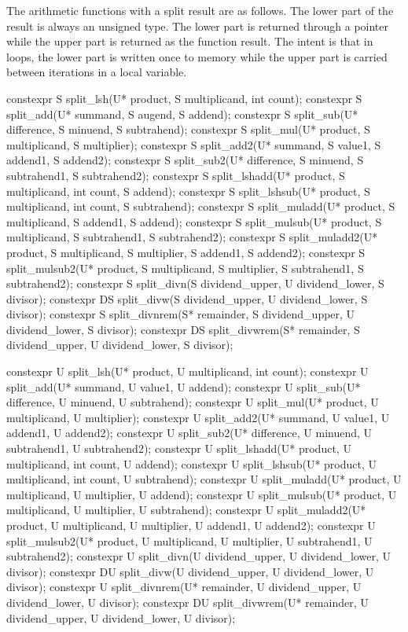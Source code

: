 \begin{addedblock}
The arithmetic functions with a split result are as follows. The lower part of the result is always an unsigned type. The lower part is returned through a pointer while the upper part is returned as the function result. The intent is that in loops, the lower part is written once to memory while the upper part is carried between iterations in a local variable.

\begin{itemdecl}
constexpr S split_lsh(U* product, S multiplicand, int count);
constexpr S split_add(U* summand, S augend, S addend);
constexpr S split_sub(U* difference, S minuend, S subtrahend);
constexpr S split_mul(U* product, S multiplicand, S multiplier);
constexpr S split_add2(U* summand, S value1, S addend1, S addend2);
constexpr S split_sub2(U* difference, S minuend, S subtrahend1, S subtrahend2);
constexpr S split_lshadd(U* product, S multiplicand, int count, S addend);
constexpr S split_lshsub(U* product, S multiplicand, int count, S subtrahend);
constexpr S split_muladd(U* product, S multiplicand, S addend1, S addend);
constexpr S split_mulsub(U* product, S multiplicand, S subtrahend1, S subtrahend2);
constexpr S split_muladd2(U* product, S multiplicand, S multiplier, S addend1, S addend2);
constexpr S split_mulsub2(U* product, S multiplicand, S multiplier, S subtrahend1, S subtrahend2);
constexpr S split_divn(S dividend_upper, U dividend_lower, S divisor);
constexpr DS split_divw(S dividend_upper, U dividend_lower, S divisor);
constexpr S split_divnrem(S* remainder, S dividend_upper, U dividend_lower, S divisor);
constexpr DS split_divwrem(S* remainder, S dividend_upper, U dividend_lower, S divisor);

constexpr U split_lsh(U* product, U multiplicand, int count);
constexpr U split_add(U* summand, U value1, U addend);
constexpr U split_sub(U* difference, U minuend, U subtrahend);
constexpr U split_mul(U* product, U multiplicand, U multiplier);
constexpr U split_add2(U* summand, U value1, U addend1, U addend2);
constexpr U split_sub2(U* difference, U minuend, U subtrahend1, U subtrahend2);
constexpr U split_lshadd(U* product, U multiplicand, int count, U addend);
constexpr U split_lshsub(U* product, U multiplicand, int count, U subtrahend);
constexpr U split_muladd(U* product, U multiplicand, U multiplier, U addend);
constexpr U split_mulsub(U* product, U multiplicand, U multiplier, U subtrahend);
constexpr U split_muladd2(U* product, U multiplicand, U multiplier, U addend1, U addend2);
constexpr U split_mulsub2(U* product, U multiplicand, U multiplier, U subtrahend1, U subtrahend2);
constexpr U split_divn(U dividend_upper, U dividend_lower, U divisor);
constexpr DU split_divw(U dividend_upper, U dividend_lower, U divisor);
constexpr U split_divnrem(U* remainder, U dividend_upper, U dividend_lower, U divisor);
constexpr DU split_divwrem(U* remainder, U dividend_upper, U dividend_lower, U divisor);
\end{itemdecl}


\end{addedblock}
